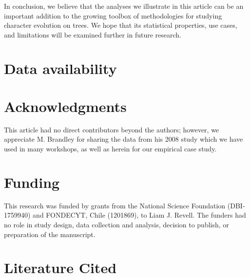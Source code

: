 \documentclass[fleqn,10pt,lineno]{wlpeerj} %
\begin{document}
In conclusion, we believe that the analyses we illustrate in this article can be an important addition to the growing toolbox of methodologies for studying character evolution on trees. We hope that its statistical properties, use cases, and limitations will be examined further in future research.

\section{Data availability}\label{data-availability}

\section{Acknowledgments}\label{acknowledgments}

This article had no direct contributors beyond the authors; however, we appreciate M. Brandley for sharing the data from his 2008 study which we have used in many workshops, as well as herein for our empirical case study.

\section{Funding}\label{funding}

This research was funded by grants from the National Science Foundation (DBI‐1759940) and FONDECYT, Chile (1201869), to Liam J. Revell. The funders had no role in study design, data collection and analysis, decision to publish, or preparation of the manuscript.

\section*{Literature Cited}\label{literature-cited}
\end{document}

